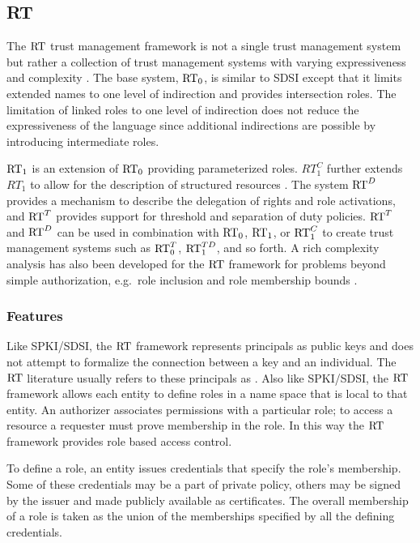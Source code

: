 \subsection{RT}

The $\text{RT}$ trust management framework is not a single trust management
system but rather a collection of trust management systems with varying
expressiveness and complexity \cite{Li:DRBTMF,Li:DCDTM,Li:RRBTMF}. The base
system, $\text{RT}_0$, is similar to SDSI except that it limits extended names to
one level of indirection and provides intersection roles. The limitation of
linked roles to one level of indirection does not reduce the expressiveness
of the language since additional indirections are possible by introducing
intermediate roles.

$\text{RT}_1$ is an extension of $\text{RT}_0$ providing parameterized roles. $RT_1^C$
further extends $RT_1$ to allow for the description of structured resources
\cite{Li:DCFTML,Li:RRBTMF}. The system $\text{RT}^D$ provides a mechanism to
describe the delegation of rights and role activations, and $\text{RT}^T$ provides
support for threshold and separation of duty policies. $\text{RT}^T$ and $\text{RT}^D$ can
be used in combination with $\text{RT}_0$, $\text{RT}_1$, or $\text{RT}_1^C$ to create trust
management systems such as $\text{RT}_0^T$, $\text{RT}_1^{TD}$, and so forth. A rich
complexity analysis has also been developed for the $\text{RT}$ framework for
problems beyond simple authorization, e.g.\ role inclusion and role membership
bounds \cite{Li:BPOCSATM}.

\subsubsection{Features}

Like SPKI/SDSI, the $\text{RT}$ framework represents principals as public keys
and does not attempt to formalize the connection between a key and an
individual. The $\text{RT}$ literature usually refers to these principals as
. Also like SPKI/SDSI, the $\text{RT}$ framework allows each
entity to define roles in a name space that is local to that entity. An
authorizer associates permissions with a particular role; to access a
resource a requester must prove membership in the role. In this way the
$\text{RT}$ framework provides role based access control.

To define a role, an entity issues credentials that specify the role's
membership. Some of these credentials may be a part of private policy,
others may be signed by the issuer and made publicly available as
certificates. The overall membership of a role is taken as the union
of the memberships specified by all the defining credentials.

